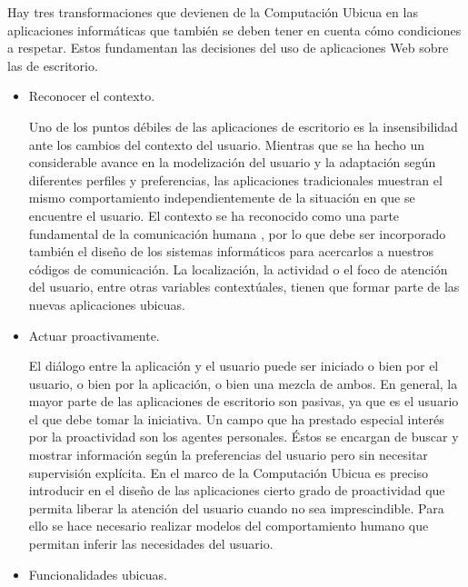 {Hay tres transformaciones que devienen de la Computación Ubicua en las
aplicaciones informáticas que también se deben tener en cuenta cómo
condiciones a respetar. Estos fundamentan las decisiones del uso de
aplicaciones Web sobre las de escritorio.

\begin{itemize}
 
\item Reconocer el contexto. 

Uno de los puntos débiles de las aplicaciones de escritorio es la insensibilidad
ante los cambios del contexto del usuario.
Mientras que se ha hecho un considerable avance en la modelización del usuario
y la adaptación según diferentes perfiles y preferencias, las aplicaciones
tradicionales muestran el mismo comportamiento independientemente de la
situación en que se encuentre el usuario. El contexto se ha reconocido como
una parte fundamental de la comunicación humana \cite{cap1.69}, por lo que
debe ser incorporado también el diseño de los sistemas informáticos para
acercarlos a nuestros códigos de comunicación. La localización, la actividad o
el foco de atención del usuario, entre otras variables contextúales, tienen que
formar parte de las nuevas aplicaciones ubicuas.

\item Actuar proactivamente. 

El diálogo entre la aplicación y el usuario puede
ser iniciado o bien por el usuario, o bien por la aplicación, o bien una
mezcla de ambos. En general, la mayor parte de las aplicaciones de escritorio
son pasivas, ya que es el usuario el que debe tomar la iniciativa. Un
campo que ha prestado especial interés por la proactividad son los agentes
personales. Éstos se encargan de buscar y mostrar información según la
preferencias del usuario pero sin necesitar supervisión explícita. En el marco
de la Computación Ubicua es preciso introducir en el diseño de las aplicaciones
cierto grado de proactividad que permita liberar la atención del usuario
cuando no sea imprescindible. Para ello se hace necesario realizar modelos
del comportamiento humano \cite{cap1.198} que permitan inferir las
necesidades del usuario.

\item Funcionalidades ubicuas. 


\end{itemize}}
